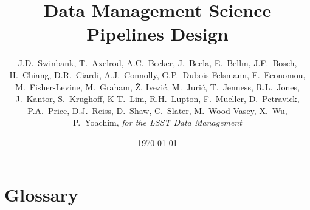 \documentclass[DM,toc,lsstdraft]{lsstdoc}
\title{Data Management Science Pipelines Design}
\author{
    J.D.~Swinbank,
    T.~Axelrod,  A.C.~Becker, J.~Becla, E.~Bellm,
    J.F.~Bosch,  H.~Chiang, D.R.~Ciardi,  A.J.~Connolly,  G.P.~Dubois-Felsmann,
    F.~Economou, M.~Fisher-Levine, M.~Graham, \v{Z}. Ivezi\'c,  M.~Juri\'c,
    T.~Jenness,  R.L.~Jones, J.~Kantor, S.~Krughoff, K-T.~Lim, R.H.~Lupton,
    F.~Mueller,  D.~Petravick, P.A.~Price,  D.J.~Reiss, D.~Shaw, C.~Slater,
    M.~Wood-Vasey, X.~Wu, P.~Yoachim,
     \emph{for the LSST Data Management}
}
\date{\today}
\begin{document}
\maketitle













\section{Glossary}
\end{document}
